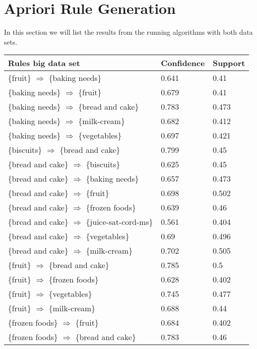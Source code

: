 \section{Apriori Rule Generation}

	In this section we will list the results from the running algorithms
	with both data sets.

	\begin{table}[H]
		\begin{tabular}{| l | l | l |}
			\hline
			Rules big data set & Confidence & Support \\ \hline
			\{fruit\} $\Rightarrow$ \{baking needs\}  & 0.641 & 0.41 \\
			\{baking needs\} $\Rightarrow$ \{fruit\}  & 0.679  & 0.41 \\
			\{baking needs\} $\Rightarrow$ \{bread and cake\}  & 0.783  & 0.473 \\
			\{baking needs\} $\Rightarrow$ \{milk-cream\}  & 0.682  & 0.412 \\
			\{baking needs\} $\Rightarrow$ \{vegetables\}  & 0.697  & 0.421 \\
			\{biscuits\} $\Rightarrow$ \{bread and cake\}  & 0.799  & 0.45 \\
			\{bread and cake\} $\Rightarrow$ \{biscuits\}  & 0.625  & 0.45 \\
			\{bread and cake\} $\Rightarrow$ \{baking needs\}  & 0.657  & 0.473 \\
			\{bread and cake\} $\Rightarrow$ \{fruit\}  & 0.698  & 0.502 \\
			\{bread and cake\} $\Rightarrow$ \{frozen foods\}  & 0.639  & 0.46 \\ 
			\{bread and cake\} $\Rightarrow$ \{juice-sat-cord-ms\}  & 0.561  & 0.404 \\
			\{bread and cake\} $\Rightarrow$ \{vegetables\}  & 0.69  & 0.496 \\
			\{bread and cake\} $\Rightarrow$ \{milk-cream\}  & 0.702  & 0.505 \\
			\{fruit\} $\Rightarrow$ \{bread and cake\}  & 0.785  & 0.5 \\
			\{fruit\} $\Rightarrow$ \{frozen foods\}  & 0.628  & 0.402 \\
			\{fruit\} $\Rightarrow$ \{vegetables\}  & 0.745  & 0.477 \\
			\{fruit\} $\Rightarrow$ \{milk-cream\}  & 0.688  & 0.44 \\
			\{frozen foods\} $\Rightarrow$ \{fruit\}  & 0.684  & 0.402 \\
			\{frozen foods\} $\Rightarrow$ \{bread and cake\}  & 0.783  & 0.46 \\

\end{tabular}
\end{table}
